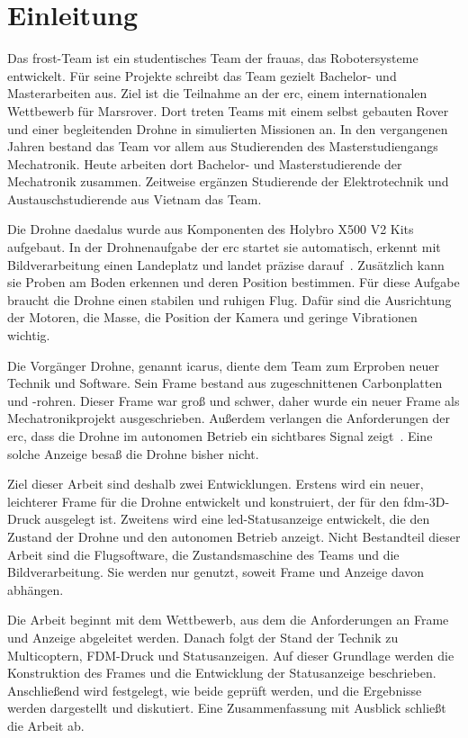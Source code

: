 \chapter{Einleitung}
\label{ch:Einfuehrung}

Das \gls{frost}-Team ist ein studentisches Team der \gls{frauas}, das Robotersysteme entwickelt. Für seine Projekte schreibt das Team gezielt Bachelor- und Masterarbeiten aus. Ziel ist die Teilnahme an der \gls{erc}, einem internationalen Wettbewerb für Marsrover. Dort treten Teams mit einem selbst gebauten Rover und einer begleitenden Drohne in simulierten Missionen an. In den vergangenen Jahren bestand das Team vor allem aus Studierenden des Masterstudiengangs Mechatronik. Heute arbeiten dort Bachelor- und Masterstudierende der Mechatronik zusammen. Zeitweise ergänzen Studierende der Elektrotechnik und Austauschstudierende aus Vietnam das Team.

Die Drohne \gls{daedalus} wurde aus Komponenten des Holybro X500 V2 Kits aufgebaut. In der Drohnenaufgabe der \gls{erc} startet sie automatisch, erkennt mit Bildverarbeitung einen Landeplatz und landet präzise darauf~\cite{ercRules2026}. Zusätzlich kann sie Proben am Boden erkennen und deren Position bestimmen. Für diese Aufgabe braucht die Drohne einen stabilen und ruhigen Flug. Dafür sind die Ausrichtung der Motoren, die Masse, die Position der Kamera und geringe Vibrationen wichtig. %

Die Vorgänger Drohne, genannt \gls{icarus}, diente dem Team zum Erproben neuer Technik und Software. Sein Frame bestand aus zugeschnittenen Carbonplatten und -rohren. Dieser Frame war groß und schwer, daher wurde ein neuer Frame als Mechatronikprojekt ausgeschrieben. Außerdem verlangen die Anforderungen der \gls{erc}, dass die Drohne im autonomen Betrieb ein sichtbares Signal zeigt~\cite{ercRequirements2026}. Eine solche Anzeige besaß die Drohne bisher nicht.

Ziel dieser Arbeit sind deshalb zwei Entwicklungen. Erstens wird ein neuer, leichterer Frame für die Drohne entwickelt und konstruiert, der für den \gls{fdm}-3D-Druck ausgelegt ist. Zweitens wird eine \gls{led}-Statusanzeige entwickelt, die den Zustand der Drohne und den autonomen Betrieb anzeigt. Nicht Bestandteil dieser Arbeit sind die Flugsoftware, die Zustandsmaschine des Teams und die Bildverarbeitung. Sie werden nur genutzt, soweit Frame und Anzeige davon abhängen.

Die Arbeit beginnt mit dem Wettbewerb, aus dem die Anforderungen an Frame und Anzeige abgeleitet werden. Danach folgt der Stand der Technik zu Multicoptern, FDM-Druck und Statusanzeigen. Auf dieser Grundlage werden die Konstruktion des Frames und die Entwicklung der Statusanzeige beschrieben. Anschließend wird festgelegt, wie beide geprüft werden, und die Ergebnisse werden dargestellt und diskutiert. Eine Zusammenfassung mit Ausblick schließt die Arbeit ab.
